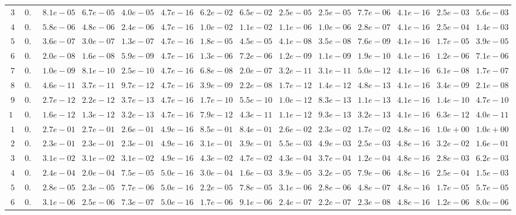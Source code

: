 \begin{tabular}{cccccccccccccc}
$3$ & $0.1$ & $8.1e-05$ & $6.7e-05$ & $4.0e-05$ & $4.7e-16$ & $6.2e-02$ & $6.5e-02$ & $2.5e-05$ & $2.5e-05$ & $7.7e-06$ & $4.1e-16$ & $2.5e-03$ & $5.6e-03$\\
$4$ & $0.1$ & $5.8e-06$ & $4.8e-06$ & $2.4e-06$ & $4.7e-16$ & $1.0e-02$ & $1.1e-02$ & $1.1e-06$ & $1.0e-06$ & $2.8e-07$ & $4.1e-16$ & $2.5e-04$ & $1.4e-03$\\
$5$ & $0.1$ & $3.6e-07$ & $3.0e-07$ & $1.3e-07$ & $4.7e-16$ & $1.8e-05$ & $4.5e-05$ & $4.1e-08$ & $3.5e-08$ & $7.6e-09$ & $4.1e-16$ & $1.7e-05$ & $3.9e-05$\\
$6$ & $0.1$ & $2.0e-08$ & $1.6e-08$ & $5.9e-09$ & $4.7e-16$ & $1.3e-06$ & $7.2e-06$ & $1.2e-09$ & $1.1e-09$ & $1.9e-10$ & $4.1e-16$ & $1.2e-06$ & $7.1e-06$\\
$7$ & $0.1$ & $1.0e-09$ & $8.1e-10$ & $2.5e-10$ & $4.7e-16$ & $6.8e-08$ & $2.0e-07$ & $3.2e-11$ & $3.1e-11$ & $5.0e-12$ & $4.1e-16$ & $6.1e-08$ & $1.7e-07$\\
$8$ & $0.1$ & $4.6e-11$ & $3.7e-11$ & $9.7e-12$ & $4.7e-16$ & $3.9e-09$ & $2.2e-08$ & $1.7e-12$ & $1.4e-12$ & $4.8e-13$ & $4.1e-16$ & $3.4e-09$ & $2.1e-08$\\
$9$ & $0.1$ & $2.7e-12$ & $2.2e-12$ & $3.7e-13$ & $4.7e-16$ & $1.7e-10$ & $5.5e-10$ & $1.0e-12$ & $8.3e-13$ & $1.1e-13$ & $4.1e-16$ & $1.4e-10$ & $4.7e-10$\\
$10$ & $0.1$ & $1.6e-12$ & $1.3e-12$ & $3.2e-13$ & $4.7e-16$ & $7.9e-12$ & $4.3e-11$ & $1.1e-12$ & $9.3e-13$ & $3.2e-13$ & $4.1e-16$ & $6.3e-12$ & $4.0e-11$\\
$1$ & $0.2$ & $2.7e-01$ & $2.7e-01$ & $2.6e-01$ & $4.9e-16$ & $8.5e-01$ & $8.4e-01$ & $2.6e-02$ & $2.3e-02$ & $1.7e-02$ & $4.8e-16$ & $1.0e+00$ & $1.0e+00$\\
$2$ & $0.2$ & $2.3e-01$ & $2.3e-01$ & $2.3e-01$ & $4.9e-16$ & $3.1e-01$ & $3.9e-01$ & $5.5e-03$ & $4.9e-03$ & $2.5e-03$ & $4.8e-16$ & $3.2e-02$ & $1.6e-01$\\
$3$ & $0.2$ & $3.1e-02$ & $3.1e-02$ & $3.1e-02$ & $4.9e-16$ & $4.3e-02$ & $4.7e-02$ & $4.3e-04$ & $3.7e-04$ & $1.2e-04$ & $4.8e-16$ & $2.8e-03$ & $6.2e-03$\\
$4$ & $0.2$ & $2.4e-04$ & $2.0e-04$ & $7.5e-05$ & $5.0e-16$ & $3.0e-04$ & $1.6e-03$ & $3.9e-05$ & $3.2e-05$ & $7.9e-06$ & $4.8e-16$ & $2.5e-04$ & $1.5e-03$\\
$5$ & $0.2$ & $2.8e-05$ & $2.3e-05$ & $7.7e-06$ & $5.0e-16$ & $2.2e-05$ & $7.8e-05$ & $3.1e-06$ & $2.8e-06$ & $4.8e-07$ & $4.8e-16$ & $1.7e-05$ & $5.7e-05$\\
$6$ & $0.2$ & $3.1e-06$ & $2.5e-06$ & $7.3e-07$ & $5.0e-16$ & $1.7e-06$ & $9.1e-06$ & $2.4e-07$ & $2.2e-07$ & $2.3e-08$ & $4.8e-16$ & $1.2e-06$ & $8.0e-06$\\

\end{tabular}
